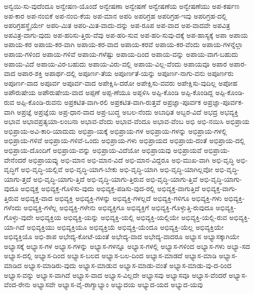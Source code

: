 {ಅನ್ವಯಿ-ಸು-ವುದೆಂದೂ
ಅನ್ವೇಷಣ-ಯೊಂದೆ
ಅನ್ವೇಷಣಾ
ಅನ್ವೇಷಣೆ
ಅನ್ವೇಷಣೆಯ
ಅನ್ವೇಷಣೆಯು
ಅಪ-ಕರ್ಷಣ
ಅಪ-ಕಾರ
ಅಪ-ನಂಬಿಕೆ
ಅಪ-ನಂಬಿ-ಕೆಯ
ಅಪ-ಮಾನ
ಅಪರಿ
ಅಪರಿಗ್ರಹ
ಅಪರಿಗ್ರಹ-ಇವು
ಅಪರಿಗ್ರಹ-ದಲ್ಲಿ
ಅಪರಿಗ್ರಹಸ್ಥೈರ್ಯೇ
ಅಪರಿ-ಮಿತ
ಅಪರಿ-ಮಿತ-ವಾದು-ದನ್ನು
ಅಪ-ರೂಪ
ಅಪ-ವಾದ
ಅಪ-ವಾದವೇ
ಅಪವಿತ್ರ
ಅಪವಿತ್ರ-ವಾಗು-ವುದು
ಅಪ-ಹರಿಸು-ತ್ತಿರು-ವೆವು
ಅಪ-ಹರಿ-ಸುವ
ಅಪ-ಹರಿ-ಸುವು-ದಕ್ಕೆ
ಅಪ-ಹಾಸ್ಯಕ್ಕೆ
ಅಪಾ
ಅಪಾಯ
ಅಪಾಯ-ಕರ
ಅಪಾಯ-ಕರ-ವಾಗಿ
ಅಪಾಯ-ಕರ-ವಾದ
ಅಪಾಯ-ಕರವೆ
ಅಪಾಯ-ಕರ-ವೆಂದು
ಅಪಾಯ-ಗಳನ್ನೆಲ್ಲಾ
ಅಪಾಯ-ಗಳಿಂದ
ಅಪಾಯ-ಗಳಿವೆ
ಅಪಾಯ-ಗಳೆಷ್ಟು
ಅಪಾಯ-ದಿಂದ
ಅಪಾಯ-ವನ್ನು
ಅಪಾಯ-ವಾಗ-ಬಹುದು
ಅಪಾಯ-ವಿದೆ
ಅಪಾಯ-ವಿರ-ಬಹುದು
ಅಪಾಯ-ವಿರು-ವಲ್ಲಿ
ಅಪಾಯ-ವಿಲ್ಲ-ವೆಂದು
ಅಪಾಯವೂ
ಅಪಾರ
ಅಪಾರ-ವಾದ
ಅಪಾರ-ಶಕ್ತಿ
ಅಪಾರ್ಥ-ದಲ್ಲಿ
ಅಪೂರ್ಣ-ತೆಯ
ಅಪೂರ್ಣತೆ-ಯನ್ನು
ಅಪೂರ್ಣ-ನಾಗು-ವನು
ಅಪೂರ್ಣರು
ಅಪೂರ್ಣ-ವಾದ
ಅಪೂರ್ವ
ಅಪೂರ್ವ-ವಾದ
ಅಪೇಕ್ಷಿಸಿ-ದರೋ
ಅಪೇಕ್ಷಿಸು-ವವರು
ಅಪೇಕ್ಷಿಸು-ವುದಿಲ್ಲ
ಅಪೋಹ
ಅಪೌರುಷೇಯ
ಅಪೌರುಷೇಯ-ವಾದ
ಅಪ್ಪಣೆ
ಅಪ್ಪ-ಣೆಯೂ
ಅಪ್ಪಳಿಸಿ
ಅಪ್ಪಿ-ಕೊಂಡಿ
ಅಪ್ಪಿ-ಕೊಂಡಿದ್ದ
ಅಪ್ಪಿ-ಕೊಂಡಿ-ರುವ
ಅಪ್ಪಿ-ಕೊಂಡಿ-ರುವನು
ಅಪ್ರಕಟಿತ-ವಾಗಿ-ರಲಿ
ಅಪ್ರಕಟಿತ-ವಾಗಿ-ರುತ್ತವೆ
ಅಪ್ರಜ್ಞಾ-ಪೂರ್ವಕ
ಅಪ್ರಜ್ಞಾ-ಪೂರ್ವಕ-ವಾಗಿ
ಅಪ್ರಜ್ಞೆ
ಅಪ್ರಜ್ಞೆಯ
ಅಪ್ರ-ಧಾನ-ವಾದ
ಅಪ್ರ-ಬುದ್ಧ
ಅಬಲ-ನೆಂದು
ಅಬಾಧಿತ
ಅಬ್ಬರ-ವಿದೆ
ಅಭದ್ರ
ಅಭವ್ಯಕ್ತಿ
ಅಭಾವ
ಅಭಾವಪ್ರತ್ಯಯಾ-ಲಂಬನಾ
ಅಭಾವ-ವೆಂದು
ಅಭಾವ-ವೆಂದೂ
ಅಭಾವ-ವೆಂಬ
ಅಭಿ
ಅಭಿ-ನಯಿಸಿ
ಅಭಿಪ್ರಾಯ
ಅಭಿಪ್ರಾಯ-ಅವಿ-ಕಾರಿ-ಯಾದುದು
ಅಭಿಪ್ರಾ-ಯಕ್ಕೆ
ಅಭಿಪ್ರಾಯ-ಗಳ
ಅಭಿಪ್ರಾಯ-ಗಳನ್ನು
ಅಭಿಪ್ರಾಯ-ಗಳಲ್ಲಿ
ಅಭಿಪ್ರಾಯ-ಗಳಿವೆ
ಅಭಿಪ್ರಾಯ-ಗಳಿವೆ-ಒಂದು
ಅಭಿಪ್ರಾಯ-ಗಳು
ಅಭಿಪ್ರಾಯದ
ಅಭಿಪ್ರಾಯ-ದಂತೆ
ಅಭಿಪ್ರಾಯ-ದಲ್ಲಿ
ಅಭಿಪ್ರಾಯ-ದೊಂದಿಗೆ
ಅಭಿಪ್ರಾಯ-ವನ್ನು
ಅಭಿಪ್ರಾಯ-ವಿದೆಯೋ
ಅಭಿಪ್ರಾಯವು
ಅಭಿಪ್ರಾಯವೆ
ಅಭಿಪ್ರಾಯ-ವೇನೆಂದರೆ
ಅಭಿಪ್ರಾಯವ್ಕು
ಅಭಿ-ಮಾನ
ಅಭಿ-ಮಾನ-ವಿದೆ
ಅಭಿ-ಮಾನ-ವಿದ್ದರೂ
ಅಭಿ-ಮುಖ-ವಾಗಿ
ಅಭಿ-ವೃದ್ಧಿ
ಅಭಿ-ವೃದ್ಧಿಗೆ
ಅಭಿ-ವೃದ್ಧಿ-ಯಲ್ಲಿವೆ
ಅಭಿ-ವೃದ್ಧಿ-ಯಾಗ-ಬೇಕು
ಅಭಿ-ವೃದ್ಧಿ-ಯಾಗಿ
ಅಭಿ-ವೃದ್ಧಿ-ಯಾಗಿಲ್ಲವೋ
ಅಭಿ-ವೃದ್ಧಿ-ಯಾಗು-ತ್ತದೆ
ಅಭಿ-ವೃದ್ಧಿ-ಯಾಗು-ತ್ತಿದೆ
ಅಭಿ-ವೃದ್ಧಿ-ಯಾಗು-ತ್ತಿರುವ
ಅಭಿ-ವೃದ್ಧಿ-ಯಾಗು-ತ್ತಿವೆ
ಅಭಿ-ವೃದ್ಧಿ-ಯಾಗು-ವುದೂ
ಅಭಿವ್ಯಕ್ತ
ಅಭಿವ್ಯಕ್ತ-ಗೊಳಿಸು-ವುದು
ಅಭಿವ್ಯಕ್ತ-ಪಡಿಸು-ವುದ-ರಲ್ಲಿ
ಅಭಿವ್ಯಕ್ತ-ವಾಗುತ್ತಿದೆ
ಅಭಿವ್ಯಕ್ತ-ವಾಗು-ತ್ತಿರುವ
ಅಭಿವ್ಯಕ್ತ-ವಾದ
ಅಭಿವ್ಯಕ್ತಿ
ಅಭಿವ್ಯಕ್ತಿ-ಗಳನ್ನು
ಅಭಿವ್ಯಕ್ತಿ-ಗಳಲ್ಲದೆ
ಅಭಿವ್ಯಕ್ತಿ-ಗಳಿಗೂ
ಅಭಿವ್ಯಕ್ತಿ-ಗಳು
ಅಭಿವ್ಯಕ್ತಿ-ಗಳೆಂದು
ಅಭಿವ್ಯಕ್ತಿ-ಗಳೆಲ್ಲ
ಅಭಿವ್ಯಕ್ತಿ-ಗಳೇನು
ಅಭಿವ್ಯಕ್ತಿಗೂ
ಅಭಿವ್ಯಕ್ತಿಗೆ
ಅಭಿವ್ಯಕ್ತಿ-ಗೊಳ್ಳುತ್ತಿ-ರುವುದೂ
ಅಭಿವ್ಯಕ್ತಿ-ಗೊಳ್ಳು-ವುದೇ
ಅಭಿವ್ಯಕ್ತಿಯ
ಅಭಿವ್ಯಕ್ತಿ-ಯನ್ನು
ಅಭಿವ್ಯಕ್ತಿ-ಯಲ್ಲಿ
ಅಭಿವ್ಯಕ್ತಿ-ಯಲ್ಲಿಯೇ
ಅಭಿವ್ಯಕ್ತಿ-ಯಲ್ಲಿ-ರುವ
ಅಭಿವ್ಯಕ್ತಿ-ಯಾ-ಗಿದೆ
ಅಭಿವ್ಯಕ್ತಿಯು
ಅಭಿವ್ಯಕ್ತಿಯೂ
ಅಭಿವ್ಯಕ್ತಿಯೆ
ಅಭಿವ್ಯಕ್ತಿ-ಯೆಂದೂ
ಅಭಿವ್ಯಕ್ತಿ-ಯೆಲ್ಲ
ಅಭಿವ್ಯಕ್ತಿಯೇ
ಅಭಿವ್ಯಕ್ತಿಯೊ
ಅಭಿ-ಶಾಪ
ಅಭೇದ್ಯ-ಕೋಟೆ-ಯಂತೆ
ಅಭೇದ್ಯ-ವಾದ
ಅಭೇದ್ಯ-ವಾದರೂ
ಅಭ್ಯಾಸ
ಅಭ್ಯಾಸಕ್ಕಾಗಿಯೇ
ಅಭ್ಯಾಸಕ್ಕೆ
ಅಭ್ಯಾಸ-ಗಳ
ಅಭ್ಯಾಸ-ಗಳನ್ನು
ಅಭ್ಯಾಸ-ಗಳನ್ನೂ
ಅಭ್ಯಾಸ-ಗಳಲ್ಲಿ
ಅಭ್ಯಾಸ-ಗಳಿಂದ
ಅಭ್ಯಾಸ-ಗಳು
ಅಭ್ಯಾ-ಸದ
ಅಭ್ಯಾಸ-ದಲ್ಲಿ
ಅಭ್ಯಾಸ-ದಿಂದ
ಅಭ್ಯಾಸ-ಬಲದ
ಅಭ್ಯಾಸ-ಬಲ-ದಿಂದ
ಅಭ್ಯಾಸ-ಮಾಡದೆ
ಅಭ್ಯಾಸ-ಮಾಡಿ
ಅಭ್ಯಾಸ-ಮಾಡಿದ
ಅಭ್ಯಾಸ-ಮಾಡಿರು-ವುದು
ಅಭ್ಯಾಸ-ಮಾಡುವ
ಅಭ್ಯಾಸ-ಮಾಡು-ವಂತೆ
ಅಭ್ಯಾಸ-ಮಾಡು-ವು-ದ-ರಿಂದ
ಅಭ್ಯಾಸ-ವನ್ನು
ಅಭ್ಯಾಸ-ವಾಗಿದೆ
ಅಭ್ಯಾಸ-ವಾದ
ಅಭ್ಯಾಸ-ವಿಲ್ಲದೇ
ಅಭ್ಯಾಸವು
ಅಭ್ಯಾಸವೂ
ಅಭ್ಯಾಸ-ವೆಂದರೆ
ಅಭ್ಯಾಸ-ವೆಂದ-ರೇನು
ಅಭ್ಯಾಸವೇ
ಅಭ್ಯಾಸ-ವೈ-ರಾಗ್ಯಾಭ್ಯಾಂ
ಅಭ್ಯುದಯ
ಅಭ್ಯುದ-ಯದ
ಅಭ್ಯುದ-ಯವು
}
